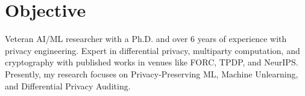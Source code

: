 \documentclass[a4paper,11pt]{article}
\begin{document}
\section{\textbf{Objective}}
\vspace{1mm}
\small{
Veteran AI/ML researcher with a Ph.D. and over 6 years of experience with privacy engineering. Expert in differential privacy, multiparty computation, and cryptography with published works in venues like FORC, TPDP, and NeurIPS. Presently, my research focuses on Privacy-Preserving ML, Machine Unlearning, and Differential Privacy Auditing. 

}
\vspace{-2mm}
\end{document}
